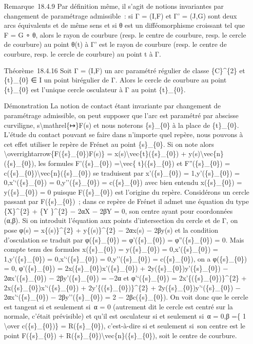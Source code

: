 \documentclass[]{article}
\begin{document}
Remarque~18.4.9 Par définition même, il s'agit de notions invariantes
par changement de paramétrage admissible~: si Γ = (I,F) et Γ' = (J,G)
sont deux arcs équivalents et de même sens et si θ est un
difféomorphisme croissant tel que F = G ∘ θ, alors le rayon de courbure
(resp. le centre de courbure, resp. le cercle de courbure) au point θ(t)
à Γ' est le rayon de courbure (resp. le centre de courbure, resp. le
cercle de courbure) au point t à Γ.

Théorème~18.4.16 Soit Γ = (I,F) un arc paramétré régulier de classe
\{C\}\^{}\{2\} et \{t\}\_\{0\} ∈ I un point birégulier de Γ. Alors le
cercle de courbure au point \{t\}\_\{0\} est l'unique cercle osculateur
à Γ au point \{t\}\_\{0\}.

Démonstration La notion de contact étant invariante par changement de
paramétrage admissible, on peut supposer que l'arc est paramétré par
abscisse curviligne, s\textbackslash{}mathrel\{↦\}F(s) et nous noterons
\{s\}\_\{0\} à la place de \{t\}\_\{0\}. L'étude du contact pouvant se
faire dans n'importe quel repère, nous pouvons à cet effet utiliser le
repère de Frénet au point \{s\}\_\{0\}. Si on note alors
\textbackslash{}overrightarrow\{F(\{s\}\_\{0\})F(s)\} =
x(s)\textbackslash{}vec\{t\}(\{s\}\_\{0\}) +
y(s)\textbackslash{}vec\{n\}(\{s\}\_\{0\}), les formules
F'(\{s\}\_\{0\}) =\textbackslash{}vec\{ t\}(\{s\}\_\{0\}) et
F''(\{s\}\_\{0\}) =
c(\{s\}\_\{0\})\textbackslash{}vec\{n\}(\{s\}\_\{0\}) se traduisent par
x'(\{s\}\_\{0\}) = 1,y'(\{s\}\_\{0\}) = 0,x'`(\{s\}\_\{0\}) =
0,y''(\{s\}\_\{0\}) = c(\{s\}\_\{0\}) avec bien entendu x(\{s\}\_\{0\})
= y(\{s\}\_\{0\}) = 0 puisque F(\{s\}\_\{0\}) est l'origine du repère.
Considérons un cercle passant par F(\{s\}\_\{0\})~; dans ce repère de
Frénet il admet une équation du type \{X\}\^{}\{2\} + \{Y \}\^{}\{2\} −
2αX − 2βY = 0, son centre ayant pour coordonnées (α,β). Si on introduit
l'équation aux points d'intersection du cercle et de Γ, on pose φ(s) =
x\{(s)\}\^{}\{2\} + y\{(s)\}\^{}\{2\} − 2αx(s) − 2βy(s) et la condition
d'osculation se traduit par φ(\{s\}\_\{0\}) = φ'(\{s\}\_\{0\}) =
φ''(\{s\}\_\{0\}) = 0. Mais compte tenu des formules x(\{s\}\_\{0\}) =
y(\{s\}\_\{0\}) = 0,x'(\{s\}\_\{0\}) = 1,y'(\{s\}\_\{0\}) =
0,x'`(\{s\}\_\{0\}) = 0,y''(\{s\}\_\{0\}) = c(\{s\}\_\{0\}), on a
φ(\{s\}\_\{0\}) = 0, φ'(\{s\}\_\{0\}) = 2x(\{s\}\_\{0\})x'(\{s\}\_\{0\})
+ 2y(\{s\}\_\{0\})y'(\{s\}\_\{0\}) − 2αx'(\{s\}\_\{0\}) −
2βy'(\{s\}\_\{0\}) = −2α et φ'`(\{s\}\_\{0\}) =
2x'\{(\{s\}\_\{0\})\}\^{}\{2\} + 2x(\{s\}\_\{0\})x'`(\{s\}\_\{0\}) +
2y'\{(\{s\}\_\{0\})\}\^{}\{2\} + 2y(\{s\}\_\{0\})y'`(\{s\}\_\{0\}) −
2αx'`(\{s\}\_\{0\}) − 2βy''(\{s\}\_\{0\}) = 2 − 2βc(\{s\}\_\{0\}). On
voit donc que le cercle est tangent si et seulement si~α = 0 (autrement
dit le cercle est centré sur la normale, c'était prévisible) et qu'il
est osculateur si et seulement si~α = 0,β =\{ 1 \textbackslash{}over
c(\{s\}\_\{0\})\} = R(\{s\}\_\{0\}), c'est-à-dire si et seulement si~son
centre est le point F(\{s\}\_\{0\}) +
R(\{s\}\_\{0\})\textbackslash{}vec\{n\}(\{s\}\_\{0\}), soit le centre de
courbure.
\end{document}
